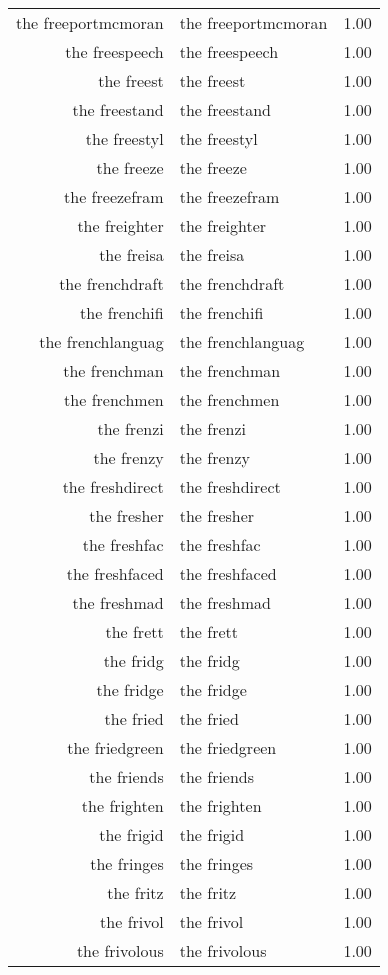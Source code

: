 \begin{table}[ht]
\begin{tabular}{rlr}
  the freeportmcmoran & the freeportmcmoran & 1.00 \\ 
  the freespeech & the freespeech & 1.00 \\ 
  the freest & the freest & 1.00 \\ 
  the freestand & the freestand & 1.00 \\ 
  the freestyl & the freestyl & 1.00 \\ 
  the freeze & the freeze & 1.00 \\ 
  the freezefram & the freezefram & 1.00 \\ 
  the freighter & the freighter & 1.00 \\ 
  the freisa & the freisa & 1.00 \\ 
  the frenchdraft & the frenchdraft & 1.00 \\ 
  the frenchifi & the frenchifi & 1.00 \\ 
  the frenchlanguag & the frenchlanguag & 1.00 \\ 
  the frenchman & the frenchman & 1.00 \\ 
  the frenchmen & the frenchmen & 1.00 \\ 
  the frenzi & the frenzi & 1.00 \\ 
  the frenzy & the frenzy & 1.00 \\ 
  the freshdirect & the freshdirect & 1.00 \\ 
  the fresher & the fresher & 1.00 \\ 
  the freshfac & the freshfac & 1.00 \\ 
  the freshfaced & the freshfaced & 1.00 \\ 
  the freshmad & the freshmad & 1.00 \\ 
  the frett & the frett & 1.00 \\ 
  the fridg & the fridg & 1.00 \\ 
  the fridge & the fridge & 1.00 \\ 
  the fried & the fried & 1.00 \\ 
  the friedgreen & the friedgreen & 1.00 \\ 
  the friends & the friends & 1.00 \\ 
  the frighten & the frighten & 1.00 \\ 
  the frigid & the frigid & 1.00 \\ 
  the fringes & the fringes & 1.00 \\ 
  the fritz & the fritz & 1.00 \\ 
  the frivol & the frivol & 1.00 \\ 
  the frivolous & the frivolous & 1.00 \\ 

\end{tabular}
\end{table}
